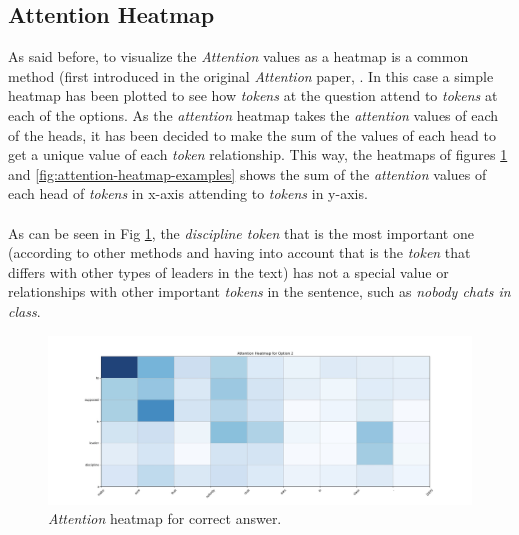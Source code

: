 \subsection{Attention Heatmap}
\label{sec:AttentionHeatmapResults}
\noindent As said before, to visualize the \emph{Attention} values as a heatmap is a common method (first introduced in the original \emph{Attention} paper, \cite{Bahdanau2014}. In this case a simple heatmap has been plotted to see how \emph{tokens} at the question attend to \emph{tokens} at each of the options. As the \emph{attention} heatmap takes the \emph{attention} values of each of the heads, it has been decided to make the sum of the values of each head to get a unique value of each \emph{token} relationship. This way, the heatmaps of figures \ref{fig:attention-heatmap-c} and \ref{fig:attention-heatmap-examples} shows the sum of the \emph{attention} values of each head of \emph{tokens} in x-axis attending to \emph{tokens} in y-axis.
\paragraph{}
As can be seen in Fig \ref{fig:attention-heatmap-c}, the \emph{discipline token} that is the most important one (according to other methods and having into account that is the \emph{token} that differs with other types of leaders in the text) has not a special value or relationships with other important \emph{tokens} in the sentence, such as \emph{nobody chats in class}. 
\begin{figure}[h]
	\centering
	\includegraphics[scale=0.35]{images/attention_heatmap_2}
	\caption{\emph{Attention} heatmap for correct answer.}
	\label{fig:attention-heatmap-c}
\end{figure}
